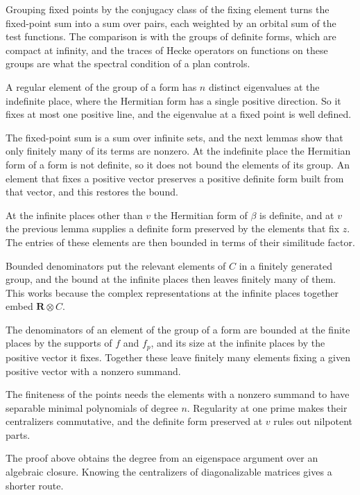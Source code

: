 Grouping fixed points by the conjugacy class of the fixing element turns the fixed-point sum into a sum
over pairs, each weighted by an orbital sum of the test functions. The comparison is with the groups of
definite forms, which are compact at infinity, and the traces of Hecke operators on functions on these
groups are what the spectral condition of a plan controls.

A regular element of the group of a form has $n$ distinct eigenvalues at the indefinite place, where
the Hermitian form has a single positive direction. So it fixes at most one positive line, and the
eigenvalue at a fixed point is well defined.

The fixed-point sum is a sum over infinite sets, and the next lemmas show that only finitely many of its
terms are nonzero. At the indefinite place the Hermitian form of a form is not definite, so it does not
bound the elements of its group. An element that fixes a positive vector preserves a positive definite
form built from that vector, and this restores the bound.

At the infinite places other than $v$ the Hermitian form of $\beta$ is definite, and at $v$ the previous
lemma supplies a definite form preserved by the elements that fix $z$. The entries of these elements are
then bounded in terms of their similitude factor.

Bounded denominators put the relevant elements of $C$ in a finitely generated group, and the bound at the
infinite places then leaves finitely many of them. This works because the complex representations at the
infinite places together embed $\mathbf R\otimes C$.

The denominators of an element of the group of a form are bounded at the finite places by the supports of
$f$ and $f_p$, and its size at the infinite places by the positive vector it fixes. Together these leave
finitely many elements fixing a given positive vector with a nonzero summand.

The finiteness of the points needs the elements with a nonzero summand to have separable minimal
polynomials of degree $n$. Regularity at one prime makes their centralizers commutative, and the definite
form preserved at $v$ rules out nilpotent parts.

The proof above obtains the degree from an eigenspace argument over an algebraic closure. Knowing the
centralizers of diagonalizable matrices gives a shorter route.

